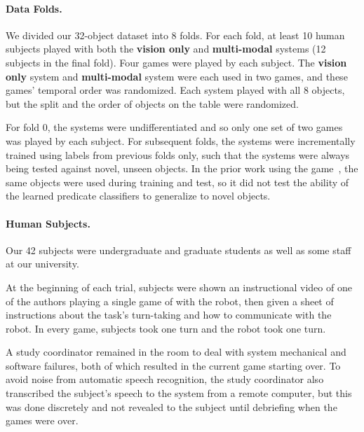 \paragraph{Data Folds.}
We divided our 32-object dataset into 8 folds.
For each fold, at least 10 human subjects played \ispy with both the \textbf{vision only} and \textbf{multi-modal} systems (12 subjects in the final fold).
Four games were played by each subject.
The \textbf{vision only} system and \textbf{multi-modal} system were each used in two games, and these games' temporal order was randomized.
Each system played with all 8 objects, but the split and the order of objects on the table were randomized.

For fold 0, the systems were undifferentiated and so only one set of two games was played by each subject. 
For subsequent folds, the systems were incrementally trained using labels from previous folds only, such that the systems were always being tested against novel, unseen objects.
In the prior work using the \ispy game~\cite{parde:ijcai15}, the same objects were used during training and test, so it did not test the ability of the learned predicate classifiers to generalize to novel objects.

\paragraph{Human Subjects.}

Our 42 subjects were undergraduate and graduate students as well as some staff at our university.

At the beginning of each trial, subjects were shown an instructional video of one of the authors playing a single game of \ispy with the robot, then given a sheet of instructions about the task's turn-taking and how to communicate with the robot. 
In every game, subjects took one turn and the robot took one turn.

A study coordinator remained in the room to deal with system mechanical and software failures, both of which resulted in the current game starting over.
To avoid noise from automatic speech recognition, the study coordinator also transcribed the subject's speech to the system from a remote computer, but this was done discretely and not revealed to the subject until debriefing when the games were over.
